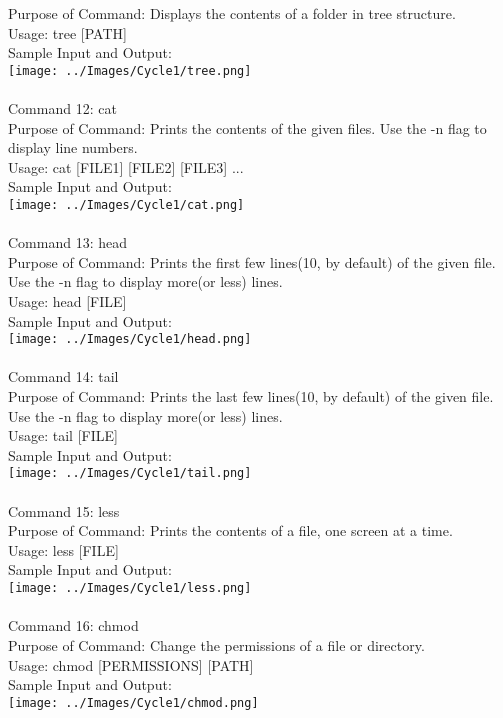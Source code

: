 \documentclass[10pt,a4paper]{report}
\begin{document}
Purpose of Command: Displays the contents of a folder in tree structure.\\
Usage: tree [PATH]\\
Sample Input and Output: \\
\texttt{[image: ../Images/Cycle1/tree.png]}\\
\pagebreak
\\
Command 12: cat\\
Purpose of Command: Prints the contents of the given files. Use the -n flag to display line numbers.\\
Usage: cat [FILE1] [FILE2] [FILE3] ...\\
Sample Input and Output: \\
\texttt{[image: ../Images/Cycle1/cat.png]}\\
\\
Command 13: head\\
Purpose of Command: Prints the first few lines(10, by default) of the given file. Use the -n flag to display more(or less) lines.\\
Usage: head [FILE]\\
Sample Input and Output: \\
\texttt{[image: ../Images/Cycle1/head.png]}\\
\pagebreak
\\
Command 14: tail\\
Purpose of Command: Prints the last few lines(10, by default) of the given file. Use the -n flag to display more(or less) lines.\\
Usage: tail [FILE]\\
Sample Input and Output: \\
\texttt{[image: ../Images/Cycle1/tail.png]}\\
\\
Command 15: less\\
Purpose of Command: Prints the contents of a file, one screen at a time.\\
Usage: less [FILE]\\
Sample Input and Output: \\
\texttt{[image: ../Images/Cycle1/less.png]}\\
\pagebreak
\\
Command 16: chmod\\
Purpose of Command: Change the permissions of a file or directory.\\
Usage: chmod [PERMISSIONS] [PATH]\\
Sample Input and Output: \\
\texttt{[image: ../Images/Cycle1/chmod.png]}\\
\\
\end{document}
